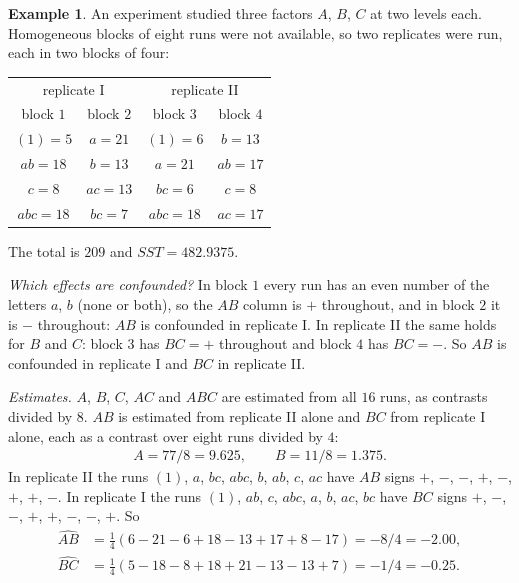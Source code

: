 \documentclass[11pt,a4paper]{article}
\numberwithin{equation}{section}
\theoremstyle{definition}
\newtheorem{exa}[thm]{Example}
\begin{document}
\begin{exa}\label{exa:partial}
An experiment studied three factors $A$, $B$, $C$ at two levels each. Homogeneous blocks of eight runs were not available, so two replicates were
run, each in two blocks of four:
\begin{center}
\begin{tabular}{c|c|c|c}
\multicolumn{2}{c|}{replicate I} & \multicolumn{2}{c}{replicate II} \\
block $1$ & block $2$ & block $3$ & block $4$ \\
\hline
$(1) = 5$ & $a = 21$ & $(1) = 6$ & $b = 13$ \\
$ab = 18$ & $b = 13$ & $a = 21$ & $ab = 17$ \\
$c = 8$ & $ac = 13$ & $bc = 6$ & $c = 8$ \\
$abc = 18$ & $bc = 7$ & $abc = 18$ & $ac = 17$
\end{tabular}
\end{center}
The total is $209$ and $SST = 482.9375$.

\emph{Which effects are confounded?} In block $1$ every run has an even number of the letters $a$, $b$ (none or both), so the $AB$ column is $+$ throughout,
and in block $2$ it is $-$ throughout: $AB$ is confounded in replicate I. In replicate II the same holds for $B$ and $C$: block $3$ has $BC = +$ throughout and
block $4$ has $BC = -$. So $AB$ is confounded in replicate I and $BC$ in replicate II.

\emph{Estimates.} $A$, $B$, $C$, $AC$ and $ABC$ are estimated from all $16$ runs, as contrasts divided by $8$. $AB$ is estimated from replicate II alone and $BC$ from
replicate I alone, each as a contrast over eight runs divided by $4$:
\begin{gather*}
A = 77/8 = 9.625 , \qquad B = 11/8 = 1.375 .
\end{gather*}
In replicate II the runs $(1)$, $a$, $bc$, $abc$, $b$, $ab$, $c$, $ac$ have $AB$ signs $+$, $-$, $-$, $+$, $-$, $+$, $+$, $-$. In replicate I the runs
$(1)$, $ab$, $c$, $abc$, $a$, $b$, $ac$, $bc$ have $BC$ signs $+$, $-$, $-$, $+$, $+$, $-$, $-$, $+$. So
\begin{align*}
\widehat{AB} &= \tfrac14(6 - 21 - 6 + 18 - 13 + 17 + 8 - 17) = -8/4 = -2.00 , \\
\widehat{BC} &= \tfrac14(5 - 18 - 8 + 18 + 21 - 13 - 13 + 7) = -1/4 = -0.25 .
\end{align*}


\end{exa}
\end{document}
